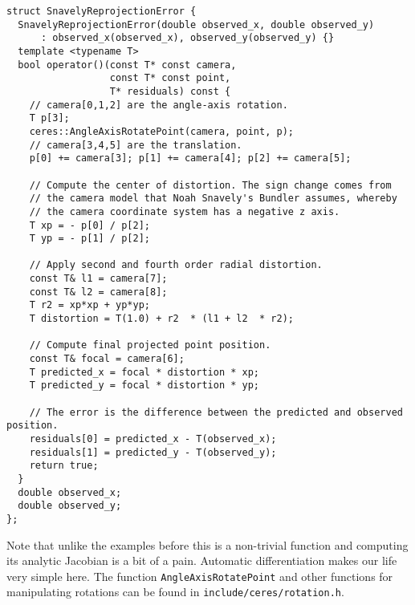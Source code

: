 \clearpage
\begin{verbatim}
struct SnavelyReprojectionError {
  SnavelyReprojectionError(double observed_x, double observed_y)
      : observed_x(observed_x), observed_y(observed_y) {}
  template <typename T>
  bool operator()(const T* const camera,
                  const T* const point,
                  T* residuals) const {
    // camera[0,1,2] are the angle-axis rotation.
    T p[3];
    ceres::AngleAxisRotatePoint(camera, point, p);
    // camera[3,4,5] are the translation.
    p[0] += camera[3]; p[1] += camera[4]; p[2] += camera[5];

    // Compute the center of distortion. The sign change comes from
    // the camera model that Noah Snavely's Bundler assumes, whereby
    // the camera coordinate system has a negative z axis.
    T xp = - p[0] / p[2];
    T yp = - p[1] / p[2];

    // Apply second and fourth order radial distortion.
    const T& l1 = camera[7];
    const T& l2 = camera[8];
    T r2 = xp*xp + yp*yp;
    T distortion = T(1.0) + r2  * (l1 + l2  * r2);

    // Compute final projected point position.
    const T& focal = camera[6];
    T predicted_x = focal * distortion * xp;
    T predicted_y = focal * distortion * yp;

    // The error is the difference between the predicted and observed position.
    residuals[0] = predicted_x - T(observed_x);
    residuals[1] = predicted_y - T(observed_y);
    return true;
  }
  double observed_x;
  double observed_y;
};
\end{verbatim}

Note that unlike the
examples before this is a non-trivial function and computing its
analytic Jacobian is a bit of a pain. Automatic differentiation makes
our life very simple here. The function \texttt{AngleAxisRotatePoint} and other functions for manipulating rotations can be found in \texttt{include/ceres/rotation.h}.  


